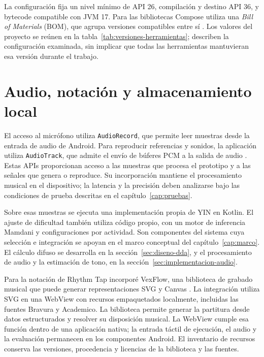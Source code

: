 La configuración fija un nivel mínimo de API 26, compilación y destino API 36,
y bytecode compatible con JVM 17. Para las bibliotecas Compose utiliza una
\textit{Bill of Materials} (BOM), que agrupa versiones compatibles entre sí
\parencite{androidComposeBom}. Los valores del proyecto se reúnen en la
tabla~\ref{tab:versiones-herramientas}; describen la configuración examinada,
sin implicar que todas las herramientas mantuvieran esa versión durante el trabajo.

\section{Audio, notación y almacenamiento local}
\label{sec:herramientas-audio-datos}
El acceso al micrófono utiliza \texttt{AudioRecord}, que permite leer muestras
desde la entrada de audio de Android. Para reproducir referencias y sonidos,
la aplicación utiliza \texttt{AudioTrack}, que admite el envío de búferes PCM
a la salida de audio \parencite{androidAudioRecord,androidAudioTrack}.
Estas APIs proporcionan acceso a las muestras que procesa el prototipo y a las
señales que genera o reproduce. Su incorporación mantiene el procesamiento
musical en el dispositivo; la latencia y la precisión deben analizarse bajo
las condiciones de prueba descritas en el capítulo~\ref{cap:pruebas}.

Sobre esas muestras se ejecuta una implementación propia de YIN en Kotlin.
El ajuste de dificultad también utiliza código propio, con un motor de inferencia
Mamdani y configuraciones por actividad. Son componentes del sistema cuya
selección e integración se apoyan en el marco conceptual del
capítulo~\ref{cap:marco}. El cálculo difuso se desarrolla en la
sección~\ref{sec:diseno-dda}, y el procesamiento de audio y la estimación de tono,
en la sección~\ref{sec:implementacion-audio}.

Para la notación de Rhythm Tap incorporé VexFlow, una biblioteca de grabado musical
que puede generar representaciones SVG y Canvas \parencite{vexflowDocumentacion}.
La integración utiliza SVG en una WebView con recursos empaquetados localmente,
incluidas las fuentes Bravura y Academico. La biblioteca permite generar la
partitura desde datos estructurados y resolver su disposición musical. La
WebView cumple esa función dentro de una aplicación nativa; la entrada táctil
de ejecución, el audio y la evaluación permanecen en los componentes Android.
El inventario de recursos conserva las versiones, procedencia y licencias de
la biblioteca y las fuentes.

